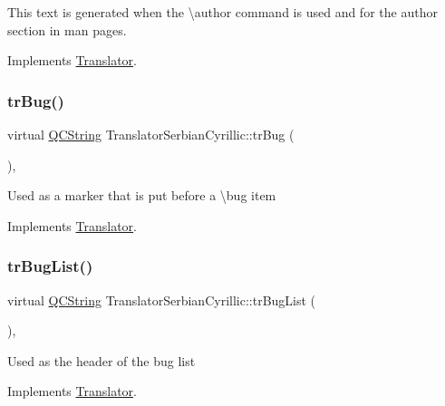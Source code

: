 This text is generated when the \textbackslash{}author command is used and for the author section in man pages. 

Implements \mbox{\hyperlink{class_translator}{Translator}}.

\mbox{\label{class_translator_serbian_cyrillic_aedd32ebb978bed3d6df4f2a9a0ddf659}} 
\subsubsection{\texorpdfstring{trBug()}{trBug()}}
{\footnotesize\ttfamily virtual \mbox{\hyperlink{class_q_c_string}{Q\+C\+String}} Translator\+Serbian\+Cyrillic\+::tr\+Bug (\begin{DoxyParamCaption}{ }\end{DoxyParamCaption})\hspace{0.3cm}{\ttfamily [inline]}, {\ttfamily [virtual]}}

Used as a marker that is put before a \textbackslash{}bug item 

Implements \mbox{\hyperlink{class_translator}{Translator}}.

\mbox{\label{class_translator_serbian_cyrillic_a75182d535aa97bc820e764a5cec03509}} 
\subsubsection{\texorpdfstring{trBugList()}{trBugList()}}
{\footnotesize\ttfamily virtual \mbox{\hyperlink{class_q_c_string}{Q\+C\+String}} Translator\+Serbian\+Cyrillic\+::tr\+Bug\+List (\begin{DoxyParamCaption}{ }\end{DoxyParamCaption})\hspace{0.3cm}{\ttfamily [inline]}, {\ttfamily [virtual]}}

Used as the header of the bug list 

Implements \mbox{\hyperlink{class_translator}{Translator}}.

\mbox{\label{class_translator_serbian_cyrillic_a0fbcd6cd269a58db86c102c52543bcd2}} 
